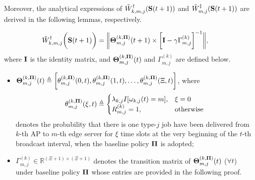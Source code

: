 Moreover, the analytical expressions of $\tilde{W}^{\dagger}_{k,m,j}(\mathbf{S}(t+1))$ and $\tilde{W}^{\ddagger}_{m,j}(\mathbf{S}(t+1))$ are derived in the following lemmas, respectively.

\begin{lemma}
    \label{lemma:w_ap}
    \begin{align}
        &\tilde{W}^{\dagger}_{k,m,j}\bigg(\mathbf{S}(t+1)\bigg) =
        \bigg\|
            \boldsymbol{\Theta}^{(k, \mathbf{\Pi})}_{m,j}(t+1) \times
            \bigg[
                \mathbf{I} - \gamma \Gamma^{(k)}_{m,j}
            \bigg]^{-1}
        \bigg\|,
        \label{w_ap}
    \end{align}
    where $\mathbf{I}$ is the identity matrix, and $\boldsymbol{\Theta}^{(k, \mathbf{\Pi})}_{m,j}(t)$ and $\Gamma^{(k)}_{m,j}$ are defined below.
    \begin{itemize}
        \item $\boldsymbol{\Theta}^{(k,\mathbf{\Pi})}_{m,j}(t) \triangleq \bigg[
            \theta^{(k,\mathbf{\Pi})}_{m,j}(0,t),
            \theta^{(k,\mathbf{\Pi})}_{m,j}(1,t),
            \dots,
            \theta^{(k,\mathbf{\Pi})}_{m,j}(\Xi,t)
            \bigg]$,
        where 
        \begin{align*}
            \theta^{(k,\mathbf{\Pi})}_{m,j}(\xi,t) \triangleq 
            \begin{cases}
                \lambda_{k,j} I[\omega_{k,j}(t)=m], & \xi=0
                \\
                R^{(k)}_{m,j} = 1, & \text{otherwise}
            \end{cases}
        \end{align*}
        denotes the probability that there is one type-$j$ job have been delivered from $k$-th AP to $m$-th edge server for $\xi$ time slots at the very beginning of the $t$-th broadcast interval, when the baseline policy $\mathbf{\Pi}$ is adopted;
        \item $\Gamma^{(k)}_{m,j} \in \mathbb{R}^{(\Xi+1)\times(\Xi+1)}$ denotes the transition matrix of $\boldsymbol{\Theta}^{(k,\mathbf{\Pi})}_{m,j}(t)$ ($\forall t$) under baseline policy $\mathbf{\Pi}$ whose entries are provided in the following proof.
    \end{itemize}
\end{lemma}
